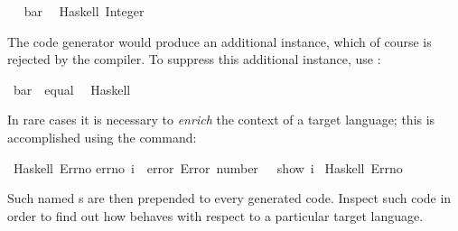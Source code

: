 \begin{isabellebody}
\isanewline
{}\isamarkupfalse%
%
\endisatagquote
{\isafoldquote}%
%
\isadelimquote
%
\endisadelimquote
%
\isadelimquotett
\ %
\endisadelimquotett
%
\isatagquotett
{}\isamarkupfalse%
\ bar\isanewline
\ \ {\isacharparenleft}Haskell\ {\isachardoublequoteopen}Integer{\isachardoublequoteclose}{\isacharparenright}%
\endisatagquotett
{\isafoldquotett}%
%
\isadelimquotett
%
\endisadelimquotett
%
\begin{isamarkuptext}%
\noindent The code generator would produce an additional instance,
  which of course is rejected by the  compiler.  To
  suppress this additional instance, use \hypertarget{command.code-instance}{\hyperlink{command.code-instance}{\mbox{}}}:%
\end{isamarkuptext}%
\isamarkuptrue%
%
\isadelimquotett
%
\endisadelimquotett
%
\isatagquotett
{}\isamarkupfalse%
\ bar\ {\isacharcolon}{\isacharcolon}\ equal\isanewline
\ \ {\isacharparenleft}Haskell\ {\isacharminus}{\isacharparenright}%
\endisatagquotett
{\isafoldquotett}%
%
\isadelimquotett
%
\endisadelimquotett
%
\isamarkuptrue%
%
\begin{isamarkuptext}%
In rare cases it is necessary to \emph{enrich} the context of a
  target language; this is accomplished using the \hypertarget{command.code-include}{\hyperlink{command.code-include}{\mbox{}}} command:%
\end{isamarkuptext}%
\isamarkuptrue%
%
\isadelimquotett
%
\endisadelimquotett
%
\isatagquotett
{}\isamarkupfalse%
\ Haskell\ {\isachardoublequoteopen}Errno{\isachardoublequoteclose}\isanewline
{\isacharverbatimopen}errno\ i\ {\isacharequal}\ error\ {\isacharparenleft}{\isachardoublequote}Error\ number{\isacharcolon}\ {\isachardoublequote}\ {\isacharplus}{\isacharplus}\ show\ i{\isacharparenright}{\isacharverbatimclose}\isanewline
\isanewline
{}\isamarkupfalse%
\ Haskell\ Errno%
\endisatagquotett
{\isafoldquotett}%
%
\isadelimquotett
%
\endisadelimquotett
%
\begin{isamarkuptext}%
\noindent Such named s are then prepended to every
  generated code.  Inspect such code in order to find out how
  \hyperlink{command.code-include}{\mbox{}} behaves with respect to a particular
  target language.%
\end{isamarkuptext}%
\isamarkuptrue%
%
\isadelimtheory
%
\endisadelimtheory
%
\isatagtheory
{}\isamarkupfalse%
%
\endisatagtheory
{\isafoldtheory}%
%
\isadelimtheory
%
\endisadelimtheory
\isanewline
\end{isabellebody}%
